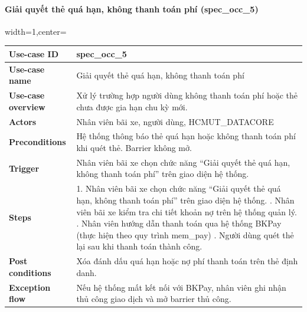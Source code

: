 \paragraph{ Giải quyết thẻ quá hạn, không thanh toán phí (spec\_occ\_5)}
\begin{adjustbox}{width=1\textwidth,center=\textwidth}
\small
\begin{tabular}{|>{\centering\arraybackslash}m{3.5cm}|m{13.2cm}|}
\hline
\textbf{Use-case ID} & spec\_occ\_5   \\ \hline
\textbf{Use-case name} & Giải quyết thẻ quá hạn, không thanh toán phí   \\ \hline
\textbf{Use-case overview} & Xử lý trường hợp người dùng không thanh toán phí hoặc thẻ chưa được gia hạn chu kỳ mới. \\ \hline
\textbf{Actors} & Nhân viên bãi xe, người dùng, HCMUT\_DATACORE \\ \hline
\textbf{Preconditions} & Hệ thống thông báo thẻ quá hạn hoặc không thanh toán phí khi quét thẻ. Barrier không mở.   \\ \hline
\textbf{Trigger} & Nhân viên bãi xe chọn chức năng “Giải quyết thẻ quá hạn, không thanh toán phí” trên giao diện hệ thống. \\ \hline
\textbf{Steps} & 
1. Nhân viên bãi xe chọn chức năng “Giải quyết thẻ quá hạn, không thanh toán phí” trên giao diện hệ thống. \newline
2. Nhân viên bãi xe kiểm tra chi tiết khoản nợ trên hệ thống quản lý. \newline
3. Nhân viên hướng dẫn thanh toán qua hệ thống BKPay (thực hiện theo quy trình mem\_pay) \newline
4. Người dùng quét thẻ lại sau khi thanh toán thành công. \\ \hline
\textbf{Post conditions} & Xóa đánh dấu quá hạn hoặc nợ phí thanh toán trên thẻ định danh. \\ \hline
\textbf{Exception flow} & Nếu hệ thống mất kết nối với BKPay, nhân viên ghi nhận thủ công giao dịch và mở barrier thủ công. \\ \hline
\end{tabular}
\end{adjustbox}

